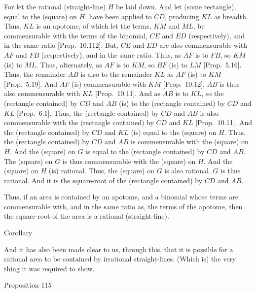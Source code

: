 For let the rational (straight-line) $H$ be laid down. And let (some rectangle),
equal to the (square) on $H$, have been applied to $CD$, producing
$KL$ as breadth. Thus, $KL$ is an apotome, of which let the
terms, $KM$ and $ML$, be  commensurable with the terms of the
binomial, $CE$ and $ED$ (respectively), and in the same ratio [Prop.~10.112]. But, $CE$ and $ED$ are also
commensurable with $AF$ and $FB$ (respectively), and in the same ratio. Thus,
as $AF$ is to $FB$, so $KM$ (is) to $ML$. Thus, alternately, as 
$AF$ is to $KM$, so $BF$ (is) to $LM$ [Prop.~5.16]. Thus, the remainder $AB$ is
also to the remainder $KL$ as $AF$ (is) to $KM$ [Prop.~5.19]. And $AF$ (is) commensurable with
$KM$ [Prop.~10.12]. $AB$ is thus also commensurable with $KL$ [Prop.~10.11]. 
And as $AB$ is to $KL$, so the (rectangle contained) by $CD$ and
$AB$ (is) to the (rectangle contained) by $CD$ and $KL$ [Prop.~6.1].  Thus, the (rectangle contained)
by $CD$ and $AB$ is also commensurable with the
(rectangle contained) by $CD$ and $KL$ [Prop.~10.11]. And the (rectangle contained) by
$CD$ and $KL$ (is) equal to the (square) on $H$. Thus, the
(rectangle contained) by $CD$ and $AB$ is  commensurable with the
(square) on $H$. And the (square) on $G$ is equal to the
(rectangle contained) by $CD$ and $AB$. The (square) on $G$ is thus commensurable with the (square) on $H$. And the (square) on $H$ (is)
rational. Thus, the (square) on $G$ is also rational. $G$ is thus rational.
And it is the square-root of the (rectangle contained) by $CD$ and $AB$.

Thus, if an area is contained by an apotome, and
a binomial whose terms are commensurable with, and in the same ratio as, the 
terms of the apotome, then the square-root of the area is a rational (straight-line).\\

\begin{center}
{\large Corollary}
\end{center}\vspace*{-7pt}

And it has also been made clear to us,  through this,  that it is
possible for  a rational
area to be contained by irrational straight-lines. (Which is) the very thing it was required to show.


\begin{center}
{\large Proposition 115}
\end{center}

